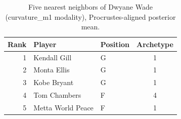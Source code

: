 \begin{table}[htbp]
  \centering\small
  \begin{tabular}{rllc}
    \toprule
    Rank & Player & Position & Archetype \\
    \midrule
    1 & Kendall Gill & G & 1 \\
    2 & Monta Ellis & G & 1 \\
    3 & Kobe Bryant & G & 1 \\
    4 & Tom Chambers & F & 4 \\
    5 & Metta World Peace & F & 1 \\
    \bottomrule
  \end{tabular}
  \caption{Five nearest neighbors of Dwyane Wade (curvature_m1 modality), Procrustes-aligned posterior mean.}
  \label{tab:Dwyane_Wade_neighbors_curvature_m1}
\end{table}

